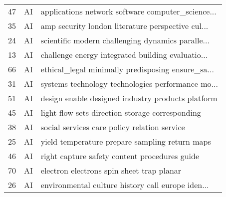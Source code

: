 \begin{tabular}{lll}
47                                                 &                                                 AI &  applications network software computer\_science... \\
35                                                 &                                                 AI &  amp security london literature perspective cul... \\
24                                                 &                                                 AI &  scientific modern challenging dynamics paralle... \\
13                                                 &                                                 AI &  challenge energy integrated building evaluatio... \\
66                                                 &                                                 AI &  ethical\_legal minimally predisposing ensure\_sa... \\
31                                                 &                                                 AI &  systems technology technologies performance mo... \\
51                                                 &                                                 AI &  design enable designed industry products platform \\
45                                                 &                                                 AI &    light flow sets direction storage corresponding \\
38                                                 &                                                 AI &       social services care policy relation service \\
25                                                 &                                                 AI &     yield temperature prepare sampling return maps \\
46                                                 &                                                 AI &      right capture safety content procedures guide \\
70                                                 &                                                 AI &          electron electrons spin sheet trap planar \\
26                                                 &                                                 AI &  environmental culture history call europe iden... \\

\end{tabular}
